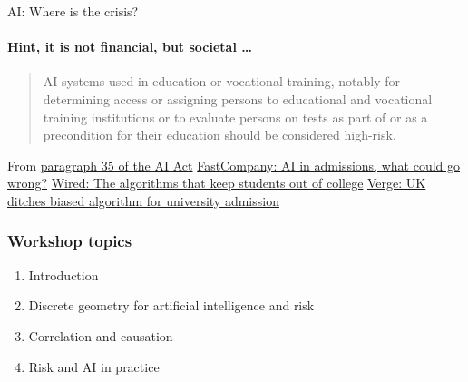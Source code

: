 \begin{frame}{AI: Where is the crisis?}
  \framesubtitle{Hint, it is not financial, but societal \ldots}
  \begin{quotation}
    AI systems used in education or vocational training, notably for determining access or assigning persons to educational and vocational training institutions or to evaluate persons on tests as part of or as a precondition for their education should be considered high-risk.
  \end{quotation}
  From \href{https://eur-lex.europa.eu/resource.html?uri=cellar:e0649735-a372-11eb-9585-01aa75ed71a1.0001.02/DOC_1&format=PDF}{paragraph 35 of the AI Act}
  \newline
  \href{https://www.fastcompany.com/90342596/schools-are-quietly-turning-to-ai-to-help-pick-who-gets-in-what-could-go-wrong}{FastCompany: AI in admissions, what could go wrong?}
  \newline
  \href{https://www.wired.com/story/algorithm-set-students-grades-altered-futures/}{Wired: The algorithms that keep students out of college}
  \newline
  \href{https://www.theverge.com/2020/8/17/21372045/uk-a-level-results-algorithm-biased-coronavirus-covid-19-pandemic-university-applications}{Verge: UK ditches biased algorithm for university admission}

\end{frame}

\begin{frame}
\frametitle{Workshop topics}
\begin{enumerate}
\item Introduction
\item Discrete geometry for artificial intelligence and risk
\item Correlation and causation
\item Risk and AI in practice
\end{enumerate}
\end{frame}

